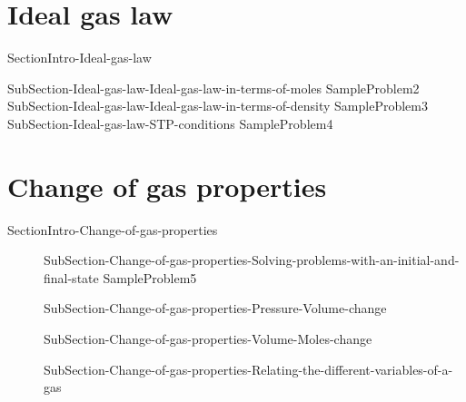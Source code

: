 \documentclass[main.tex]{subfiles}
\newcommand\chapterlabel{ChMIX-biomoleculesinsolution}\setcounter{figurenewcounter}{0}\setcounter{tablenewcounter}{0}\setcounter{formulanewcounter}{0}
\begin{document}
 \section{\faEnvira Ideal gas law}{SectionIntro-Ideal-gas-law}
\sloppy \begin{description}
 {SubSection-Ideal-gas-law-Ideal-gas-law-in-terms-of-moles}
{SampleProblem2}
 {SubSection-Ideal-gas-law-Ideal-gas-law-in-terms-of-density}
{SampleProblem3}
 {SubSection-Ideal-gas-law-STP-conditions}
{SampleProblem4}
\end{description}


 \section{\faEnvira Change of gas properties}{SectionIntro-Change-of-gas-properties}
\sloppy \begin{description}
\item[]  {SubSection-Change-of-gas-properties-Solving-problems-with-an-initial-and-final-state}
{SampleProblem5}
\item[] {SubSection-Change-of-gas-properties-Pressure-Volume-change}
 \item[] {SubSection-Change-of-gas-properties-Volume-Moles-change}
\item[]  {SubSection-Change-of-gas-properties-Relating-the-different-variables-of-a-gas}
\end{description}



 
\end{document}
